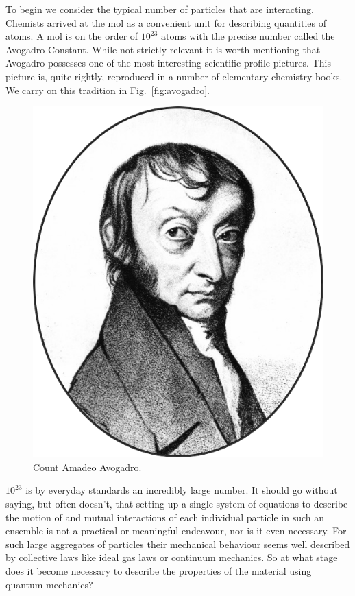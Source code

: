 To begin we consider the typical number of particles that are interacting.
Chemists arrived at the mol as a convenient unit for describing
quantities of atoms. A mol is on the order of $10^{23}$ atoms with
the precise number called the Avogadro Constant. While not strictly relevant
it is worth mentioning that Avogadro possesses one of the most
interesting scientific profile pictures. This picture is, quite rightly, reproduced
in a number of elementary chemistry books. We carry on this tradition 
in Fig.~\ref{fig:avogadro}.
%
\begin{figure}
\begin{center}
\includegraphics[scale=0.4]{./intro/Amadeo_Avogadro.png}
\end{center}
\caption{Count Amadeo Avogadro.}
\end{figure}
%
$10^{23}$ is by everyday standards an incredibly large number. 
It should go without saying, but often doesn't, that setting 
up a single system of equations to describe the motion of and mutual 
interactions of each individual particle in such an ensemble is not
a practical or meaningful endeavour, nor is it even necessary.
For such large aggregates of particles their mechanical behaviour seems 
well described by collective laws like ideal gas laws or continuum mechanics. 
So at what stage does it become necessary to describe the properties of the material
using quantum mechanics? 

